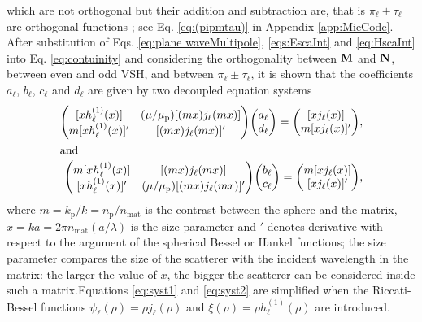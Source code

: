 %
%
which are not orthogonal but their addition and subtraction are, that is $\pi_\ell \pm \tau_\ell$ are orthogonal functions \cite{bohren_absorption_1983}; see Eq. \eqref{eq:(pipmtau)} in Appendix \ref{app:MieCode}. After substitution  of Eqs. \eqref{eq:plane waveMultipole}, \eqref{eqs:EscaInt} and \eqref{eq:HscaInt} into Eq. \eqref{eq:contuinity} and considering the orthogonality between $\vb{M}$ and $\vb{N}$,  between even and odd VSH, and between $\pi_\ell \pm \tau_\ell$, it is shown that the coefficients $a_\ell$, $b_\ell$, $c_\ell$ and $d_\ell$ are given by two decoupled equation systems
%
\begin{align}
\mqty([x h_\ell^{(1)}(x)]  & (\mu/\mu_\text{p}) [(mx) j_\ell(mx)] \\
		m[x h_\ell^{(1)}(x)]' & [(mx) j_\ell(mx)]')
		\mqty(a_\ell \\ d_\ell) = \mqty([xj_\ell(x)] \\ m[x j_\ell(x)]') ,
	\label{eq:syst1}
		\\
\intertext{and}
\mqty( m[xh_\ell^{(1)}(x)]  &  [(mx)j_\ell(mx)] \\
		[x h_\ell^{(1)}(x)]' & (\mu/\mu_\text{p})[(mx) j_\ell(mx)]' )
		\mqty(b_\ell \\ c_\ell) = \mqty(m[xj_\ell(x)] \\ [x j_\ell(x)]'),
	\label{eq:syst2}
\end{align}
%
where $m = k_\text{p} / k = n_\text{p} / n_\text{mat}$ is the contrast between the sphere and the matrix, $x= ka = 2\pi n_\text{mat} (a/\lambda)$ is the size parameter and  $'$ denotes  derivative with respect to the argument of the spherical Bessel or Hankel functions; the size parameter compares the size of the scatterer with the incident wavelength in the matrix: the larger the value of $x$, the bigger the scatterer can be considered inside such a matrix.Equations \eqref{eq:syst1} and \eqref{eq:syst2} are simplified when the Riccati-Bessel functions $\psi_\ell( \rho) = \rho j_\ell(\rho)$ and $\xi(\rho) = \rho h_\ell^{(1)}(\rho)$ are introduced.

